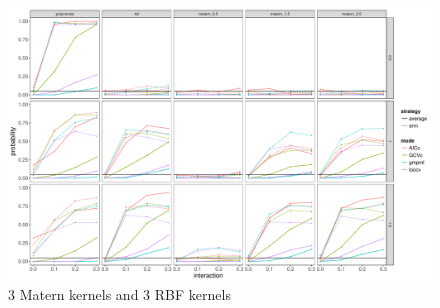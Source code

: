 \documentclass[11pt]{article}
\begin{document}
\begin{figure}
\begin{center}
\includegraphics[width=0.9\columnwidth]{L5} 
\caption{3 Matern kernels and 3 RBF kernels}
\label{fig:res}
\end{center}
\end{figure}




\clearpage



\end{document}
